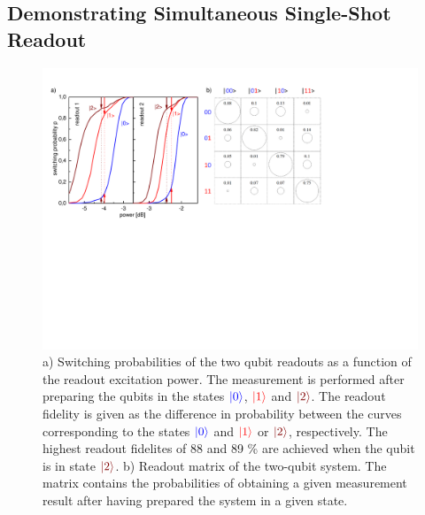 \subsection{Demonstrating Simultaneous Single-Shot Readout}

\begin{figure}[ht!]
	\centering
		\includegraphics[width=1.\textwidth]{./material/papers/grover/figures/simultaneous_readout_characteristics}
	\caption[Switching probabilities of the two qubit readouts as a function of the readout excitation power]{a) Switching probabilities of the two qubit readouts as a function of the readout excitation power. The measurement is performed after preparing the qubits in the states $\color{blue}{\left| 0 \right>}$, $\color{red}{\left| 1 \right>}$ and $\color{brown}{\ket{2}}$. The readout fidelity is given as the difference in probability between the curves corresponding to the states $\color{blue}{\left| 0 \right>}$ and $\color{red}{\left| 1 \right>}$ or $\color{brown}{\ket{2}}$, respectively. The highest readout fidelites of 88 and 89 \% are achieved when the qubit is in state $\color{brown}{\ket{2}}$. b) Readout matrix of the two-qubit system. The matrix contains the probabilities of obtaining a given measurement result after having prepared the system in a given state. }
	\label{fig:qubit_readout_characteristics}
\end{figure}

